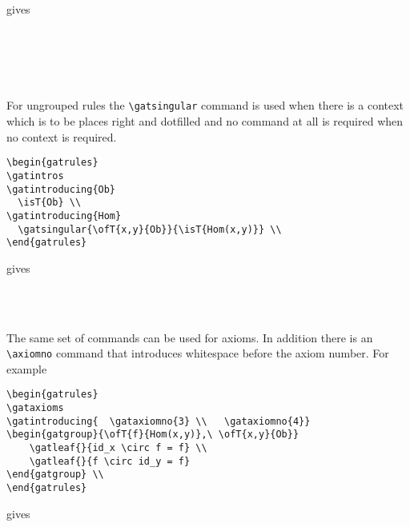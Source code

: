 \documentclass[10pt,a4paper]{article}
\begin{document}
gives 

\begin{gatrules}
\gatintros
{}
\begin{gatgroup}{}
 \\
\begin{gatgroup}{}
 \\
 \\
\end{gatgroup}
\end{gatgroup}
\end{gatrules}

For ungrouped rules the \verb'\gatsingular' command is used when there is a context which is to
be places right and dotfilled and no command at all is required when no context is required.

\begin{verbatim}
\begin{gatrules}
\gatintros                           
\gatintroducing{Ob}                  
  \isT{Ob} \\    
\gatintroducing{Hom}
  \gatsingular{\ofT{x,y}{Ob}}{\isT{Hom(x,y)}} \\										
\end{gatrules}
\end{verbatim}
gives
\begin{gatrules}
\gatintros                           
{}                  
   \\    
   \\										
\end{gatrules}

The same set of commands can be used for axioms. In addition there is an \verb'\axiomno' command that introduces
whitespace before the axiom number. For example
\begin{verbatim}
\begin{gatrules}
\gataxioms
\gatintroducing{  \gataxiomno{3} \\   \gataxiomno{4}}
\begin{gatgroup}{\ofT{f}{Hom(x,y)},\ \ofT{x,y}{Ob}}
    \gatleaf{}{id_x \circ f = f} \\
    \gatleaf{}{f \circ id_y = f}
\end{gatgroup} \\
\end{gatrules}
\end{verbatim}
gives
\end{document}
